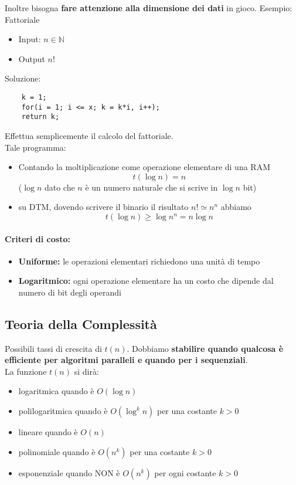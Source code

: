\newpage

Inoltre bisogna \textbf{fare attenzione alla dimensione dei dati} in gioco. Esempio: Fattoriale
\begin{itemize}
	\item Input: $n \in \mathbb{N}$
	\item Output $n!$
\end{itemize}
Soluzione: 
\begin{lstlisting}
	k = 1; 
	for(i = 1; i <= x; k = k*i, i++);
	return k;
\end{lstlisting}
Effettua semplicemente il calcolo del fattoriale.\\

Tale programma:
\begin{itemize}
	\item Contando la moltiplicazione come operazione elementare di una RAM 
	$$ t(\log n) = n $$
	($\log n$ dato che $n$ è un numero naturale che si scrive in $\log n$ bit)
	\item su DTM, dovendo scrivere il binario il risultato $n! \simeq n^n$ abbiamo
	$$ t(\log n) \geq \log n^n = n \log n $$
\end{itemize}

\paragraph{Criteri di costo: }
\begin{itemize}
	\item \textbf{Uniforme:} le operazioni elementari richiedono una unità di tempo 
	\item \textbf{Logaritmico:} ogni operazione elementare ha un costo che dipende dal numero di bit degli operandi
\end{itemize}

\newpage

\subsection*{Teoria della Complessità}

Possibili tassi di crescita di $t(n)$. Dobbiamo \textbf{stabilire quando qualcosa è efficiente per algoritmi paralleli e quando per i sequenziali}.\\

La funzione $t(n)$ si dirà: 
\begin{itemize}
	\item logaritmica quando è $O(\log n)$
	\item polilogaritmica quando è $O(\log^k n)$ per una costante $k>0$
	\item lineare quando è $O(n)$
	\item polinomiale quando è $O(n^k)$ per una costante $k>0$
	\item esponenziale quando NON è $O(n^k)$ per ogni costante $k>0$ 
\end{itemize}

